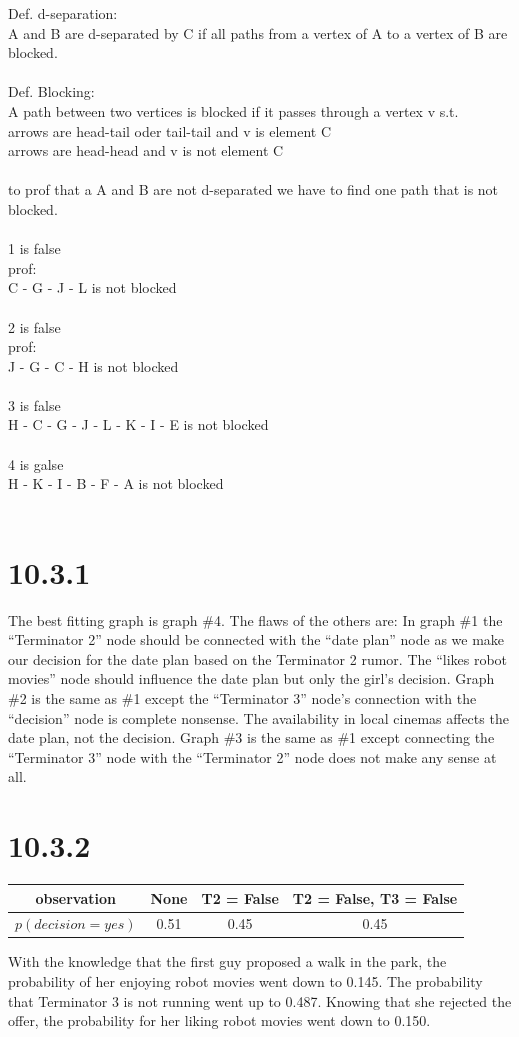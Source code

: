 \documentclass[a4paper,11pt]{article}
\theoremstyle{definition}
\theoremstyle{plain}
\theoremstyle{remark}
\begin{document}
Def. d-separation:\\
A and B are d-separated by C if all paths from a vertex of A to a vertex of B are blocked.\\
\\
Def. Blocking:\\
A path between two vertices is blocked if it passes through a vertex v s.t.\\
      arrows are head-tail oder tail-tail and v is element C\\
      arrows are head-head and v is not element C\\
\\
to prof that a A and B are not d-separated we have to find one path that is not blocked.\\
\\
1 is false\\
prof: \\
C - G - J - L is not blocked\\
\\
2 is false\\
prof: \\
J - G - C - H is not blocked\\
\\
3 is false\\
H - C - G - J - L - K - I - E is not blocked\\
\\
4 is galse\\
H - K - I - B - F - A is not blocked\\
\\
\section*{10.3.1}
The best fitting graph is graph \#4. The flaws of the others are:
In graph \#1 the ``Terminator 2'' node should be connected with the ``date plan'' node as we make our decision for the date plan based on the Terminator 2 rumor. The ``likes robot movies'' node should influence the date plan but only the girl's decision. Graph \#2 is the same as \#1 except the ``Terminator 3'' node's connection with the ``decision'' node is complete nonsense. The availability in local cinemas affects the date plan, not the decision. Graph \#3 is the same as \#1 except connecting the ``Terminator 3'' node with the ``Terminator 2'' node does not make any sense at all.

\section*{10.3.2}
\begin{table}[H]
\centering
\begin{tabular}{|c|c|c|c|}
\hline
observation & None & T2 = False & T2 = False, T3 = False \\ \hline
$p(decision = yes)$ & 0.51 & 0.45 & 0.45 \\ \hline
\end{tabular}
\end{table}

With the knowledge that the first guy proposed a walk in the park, the probability of her enjoying robot movies went down to 0.145. The probability that Terminator 3 is not running went up to 0.487. Knowing that she rejected the offer, the probability for her liking robot movies went down to 0.150.
\end{document}

